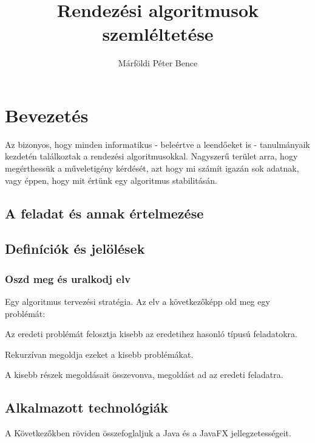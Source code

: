 \documentclass{elteikthesis}
\title{Rendezési algoritmusok szemléltetése}
\author{Márföldi Péter Bence}
\begin{document}
\frontmatter

	\maketitle
	\tableofcontents
	
\mainmatter

	\cfoot{\thepage}
	\pagestyle{fancy} 

\chapter{Bevezetés} 
Az bizonyos, hogy minden informatikus - beleértve a leendőeket is - tanulmányaik kezdetén találkoztak a rendezési algoritmusokkal. Nagyszerű terület arra, hogy megérthessük a műveletigény kérdését, azt hogy mi számít igazán sok adatnak, vagy éppen, hogy mit értünk egy algoritmus stabilitásán.

\section{A feladat és annak értelmezése} 
\section{Definíciók és jelölések}
\subsection{Oszd meg és uralkodj elv}
Egy algoritmus tervezési stratégia. Az elv\cite{Cormen} a következőképp old meg egy problémát:
\begin{description}[0.5cm]
	\item[$\bullet$] Az eredeti problémát felosztja kisebb az eredetihez hasonló típusú feladatokra.
	\item[$\bullet$] Rekurzívan megoldja ezeket a kisebb problémákat.
	\item[$\bullet$] A kisebb részek megoldásait összevonva,  megoldást ad az eredeti feladatra.
\end{description}


\section{Alkalmazott technológiák}
A Következőkben röviden összefoglaljuk a Java\cite{Java} és a JavaFX\cite{JavaFX} jellegzetességeit.
\end{document}
